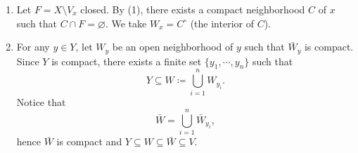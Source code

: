 \begin{proofenv}
\begin{enumerate}[label=(\arabic*)]
\begin{figure}[H]
\begin{center}
\begin{tikzpicture}[x=0.75pt,y=0.75pt,yscale=-1,xscale=1]
                    
                    \end{tikzpicture}
                \end{center}
            \end{figure}
            Moreover, $\bar{U} \cap F \subseteq N \cap F \subseteq V$, so $\bar{U} \cap F \subseteq \bar{U} \cap V = \varnothing$.
            We take $\bar{U}$ as the desired compact neighborhood of $x$.
        \item Let $F = X \setminus V_x$ closed.
            By (1), there exists a compact neighborhood $C$ of $x$ such that $C \cap F = \varnothing$.
            We take $W_x = C^\circ$ (the interior of $C$).
        \item For any $y \in Y$, let $W_y$ be an open neighborhood of $y$ such that $\bar{W}_y$ is compact.
            Since $Y$ is compact, there exists a finite set $\{y_1,\cdots,y_n\}$ such that
            $$Y \subseteq W \coloneq \bigcup_{i=1}^n W_{y_i}.$$
            Notice that
            $$\bar{W} = \bigcup_{i=1}^n \bar{W}_{y_i},$$
            hence $\bar{W}$ is compact and $Y \subseteq W \subseteq \bar{W} \subseteq V.$
    \end{enumerate}
\end{proofenv}

